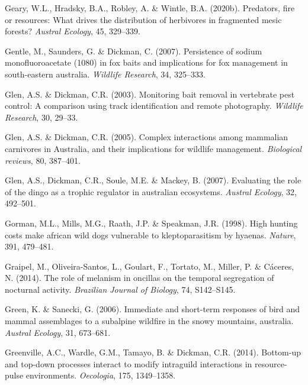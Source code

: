 \documentclass[11pt,a4paper,titlepage,twoside,openright]{style/unimelbthesis}
\begin{document}
\begin{mainmatter}
\leavevmode\hypertarget{ref-geary2020predators}{}%
Geary, W.L., Hradsky, B.A., Robley, A. \& Wintle, B.A. (2020b). Predators, fire or resources: What drives the distribution of herbivores in fragmented mesic forests? \emph{Austral Ecology}, 45, 329--339.

\leavevmode\hypertarget{ref-gentle2007persistence}{}%
Gentle, M., Saunders, G. \& Dickman, C. (2007). Persistence of sodium monofluoroacetate (1080) in fox baits and implications for fox management in south-eastern australia. \emph{Wildlife Research}, 34, 325--333.

\leavevmode\hypertarget{ref-glen2003monitoring}{}%
Glen, A.S. \& Dickman, C.R. (2003). Monitoring bait removal in vertebrate pest control: A comparison using track identification and remote photography. \emph{Wildlife Research}, 30, 29--33.

\leavevmode\hypertarget{ref-glen2005complex}{}%
Glen, A.S. \& Dickman, C.R. (2005). Complex interactions among mammalian carnivores in Australia, and their implications for wildlife management. \emph{Biological reviews}, 80, 387--401.

\leavevmode\hypertarget{ref-glen2007evaluating}{}%
Glen, A.S., Dickman, C.R., Soule, M.E. \& Mackey, B. (2007). Evaluating the role of the dingo as a trophic regulator in australian ecosystems. \emph{Austral Ecology}, 32, 492--501.

\leavevmode\hypertarget{ref-gorman1998high}{}%
Gorman, M.L., Mills, M.G., Raath, J.P. \& Speakman, J.R. (1998). High hunting costs make african wild dogs vulnerable to kleptoparasitism by hyaenas. \emph{Nature}, 391, 479--481.

\leavevmode\hypertarget{ref-graipel2014role}{}%
Graipel, M., Oliveira-Santos, L., Goulart, F., Tortato, M., Miller, P. \& Cáceres, N. (2014). The role of melanism in oncillas on the temporal segregation of nocturnal activity. \emph{Brazilian Journal of Biology}, 74, S142--S145.

\leavevmode\hypertarget{ref-green2006immediate}{}%
Green, K. \& Sanecki, G. (2006). Immediate and short-term responses of bird and mammal assemblages to a subalpine wildfire in the snowy mountains, australia. \emph{Austral Ecology}, 31, 673--681.

\leavevmode\hypertarget{ref-greenville2014bottom}{}%
Greenville, A.C., Wardle, G.M., Tamayo, B. \& Dickman, C.R. (2014). Bottom-up and top-down processes interact to modify intraguild interactions in resource-pulse environments. \emph{Oecologia}, 175, 1349--1358.


\end{mainmatter}
\end{document}
